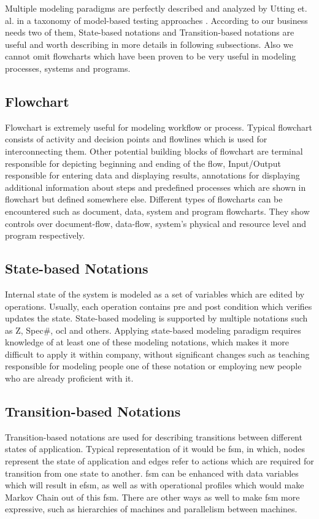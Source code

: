 Multiple modeling paradigms are perfectly described and analyzed by Utting et. al. in a taxonomy of model-based testing approaches \cite{Pretschner_Taxonomy}. According to our business needs two of them, State-based notations and Transition-based notations are useful and worth describing in more details in following subsections. Also we cannot omit flowcharts which have been proven to be very useful in modeling processes, systems and programs. 

\subsection{Flowchart}
\par
Flowchart \cite{Flowchart} is extremely useful for modeling workflow or process. Typical flowchart consists of activity and decision points and flowlines which is used for interconnecting them. Other potential building blocks of flowchart are terminal responsible for depicting beginning and ending of the flow, Input/Output responsible for entering data and displaying results, annotations for displaying additional information about steps and predefined processes which are shown in flowchart but defined somewhere else. Different types of flowcharts can be encountered such as document, data, system and program flowcharts. They show controls over document-flow, data-flow, system's physical and resource level and program respectively.

\subsection{State-based Notations}
\par
Internal state of the system is modeled as a set of variables which are edited by operations. Usually, each operation contains pre and post condition which verifies updates the state.\cite{Pretschner_Taxonomy} State-based modeling is supported by multiple notations such as Z, Spec\#, \acrshort{ocl} and others. Applying state-based modeling paradigm requires knowledge of at least one of these modeling notations, which makes it more difficult to apply it within company, without significant changes such as teaching responsible for modeling people one of these notation or employing new people who are already proficient with it. 

\subsection{Transition-based Notations}
\par
Transition-based notations are used for describing transitions between different states of application. Typical representation of it would be \acrshort{fsm}, in which, nodes represent the state of application and edges refer to actions which are required for transition from one state to another. \acrshort{fsm} can be enhanced with data variables which will result in \acrshort{efsm}, as well as with operational profiles which would make Markov Chain out of this \acrshort{fsm}. There are other ways as well to make \acrshort{fsm} more expressive, such as hierarchies of machines and parallelism between machines\cite{Pretschner_Taxonomy}.

